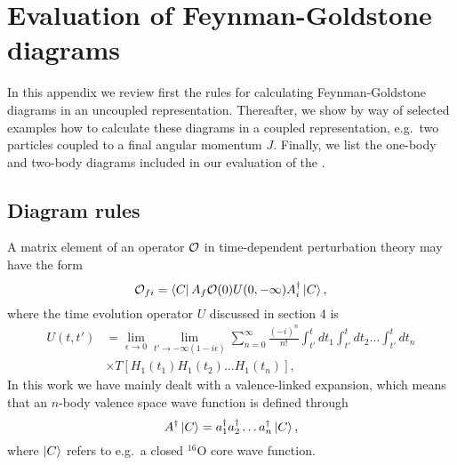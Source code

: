 
\appendix


\section{Evaluation of Feynman-Goldstone diagrams }


In this appendix we review first the rules for calculating Feynman-Goldstone
diagrams in an uncoupled
representation. Thereafter, we show by way of selected examples how to
calculate these diagrams in a coupled representation,
e.g.\ two particles coupled to a final angular momentum $J$.
Finally,
we list the one-body and two-body diagrams
included in our evaluation of the \qbox.



\subsection{Diagram rules}

A matrix element of an operator ${\cal O}$ 
in time-dependent perturbation theory may have the
form
\begin{equation}
{\cal O}_{fi} =\left\langle C \right|A_f {\cal O}(0) U(0,-\infty)A_i^{\dagger}\left| C \right\rangle,
\end{equation}
where the time evolution operator $U$ discussed in section 4 is
\begin{eqnarray}
   U(t,t')&=\lim_{\epsilon \rightarrow 0}
   \lim_{t'\rightarrow -\infty (1-i\epsilon )}
   {\displaystyle\sum_{n=0}^{\infty}\frac{(-i)^n}{n!}
   \int_{t'}^{t}dt_1  \int_{t'}^{t}dt_2\dots  \int_{t'}^{t}dt_n}
		\\ \nonumber
	     &  \times T\left[H_1(t_1)H_1(t_2)\dots H_1(t_n)\right],
\end{eqnarray}
In this work we have mainly dealt with a valence-linked expansion, which
means that an $n$-body valence space wave function is defined through 
\begin{equation}
A^{\dagger}\left| C \right\rangle=a_1^{\dagger}a_2^{\dagger}\dots a_n^{\dagger}\left| C \right\rangle,
\end{equation}
where $\left| C \right\rangle$ refers to e.g.\ a closed $^{16}$O core wave function.


